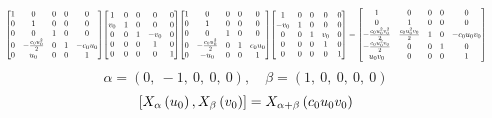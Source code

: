 \documentclass[11pt]{article}
\theoremstyle{definition}
\begin{document}
\[
\scaletoalign{\textwidth}{{\left[\begin{matrix}1 & 0 & 0 & 0 & 0\\0 & 1 & 0 & 0 & 0\\0 & 0 & 1 & 0 & 0\\0 & - \frac{c_{0} u_{0}^{2}}{2} & 0 & 1 & - c_{0} u_{0}\\0 & u_{0} & 0 & 0 & 1\end{matrix}\right]} {\left[\begin{matrix}1 & 0 & 0 & 0 & 0\\v_{0} & 1 & 0 & 0 & 0\\0 & 0 & 1 & - v_{0} & 0\\0 & 0 & 0 & 1 & 0\\0 & 0 & 0 & 0 & 1\end{matrix}\right]} {\left[\begin{matrix}1 & 0 & 0 & 0 & 0\\0 & 1 & 0 & 0 & 0\\0 & 0 & 1 & 0 & 0\\0 & - \frac{c_{0} u_{0}^{2}}{2} & 0 & 1 & c_{0} u_{0}\\0 & - u_{0} & 0 & 0 & 1\end{matrix}\right]} {\left[\begin{matrix}1 & 0 & 0 & 0 & 0\\- v_{0} & 1 & 0 & 0 & 0\\0 & 0 & 1 & v_{0} & 0\\0 & 0 & 0 & 1 & 0\\0 & 0 & 0 & 0 & 1\end{matrix}\right]} = {\left[\begin{matrix}1 & 0 & 0 & 0 & 0\\0 & 1 & 0 & 0 & 0\\- \frac{c_{0} u_{0}^{2} v_{0}^{2}}{2} & \frac{c_{0} u_{0}^{2} v_{0}}{2} & 1 & 0 & - c_{0} u_{0} v_{0}\\- \frac{c_{0} u_{0}^{2} v_{0}}{2} & 0 & 0 & 1 & 0\\u_{0} v_{0} & 0 & 0 & 0 & 1\end{matrix}\right]}}
\]
\[
\alpha = \left( 0, \  -1, \  0, \  0, \  0\right), \quad \beta = \left( 1, \  0, \  0, \  0, \  0\right)
\]
\[
\scaletoalign{\textwidth}{\left[ X_{\alpha}\left(u_{0}\right), X_{\beta}\left(v_{0}\right) \right] = X_{\alpha + \beta}\left(c_{0} u_{0} v_{0}\right)}
\]
\end{document}
